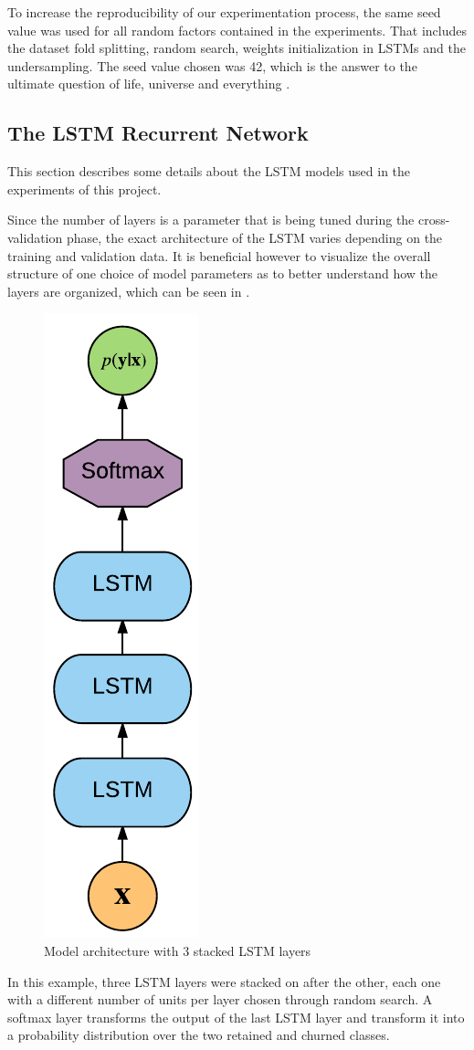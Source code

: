 \documentclass{kththesis}
\begin{document}
To increase the reproducibility of our experimentation process, the same seed value was used for all random factors contained in the experiments. That includes the dataset fold splitting, random search, weights initialization in LSTMs and the undersampling. The seed value chosen was 42, which is the answer to the ultimate question of life, universe and everything \citep{adams1995hitchhikers}.

\subsection{The LSTM Recurrent Network}

This section describes some details about the LSTM models used in the experiments of this project.

Since the number of layers is a parameter that is being tuned during the cross-validation phase, the exact architecture of the LSTM varies depending on the training and validation data. It is beneficial however to visualize the overall structure of one choice of model parameters as to better understand how the layers are organized, which can be seen in .

	\begin{figure}[h]
    \centering
    \includegraphics[height=0.7\textwidth,keepaspectratio]{figures/lstm_arch.pdf}
    \caption{Model architecture with 3 stacked LSTM layers}
    \label{fig:lstm_arch}
	\end{figure}

In this example, three LSTM layers were stacked on after the other, each one with a different number of units per layer chosen through random search. A softmax layer transforms the output of the last LSTM layer and transform it into a probability distribution over the two retained and churned classes.
\end{document}
